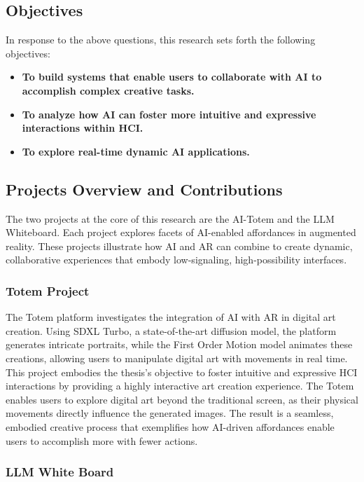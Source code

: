 \subsection{Objectives}

In response to the above questions, this research sets forth the following objectives:

\begin{itemize}
    \item \textbf{To build systems that enable users to collaborate with AI to accomplish complex creative tasks.}
    \item \textbf{To analyze how AI can foster more intuitive and expressive interactions within HCI.}
    \item \textbf{To explore real-time dynamic AI applications.}
\end{itemize}


\subsection{Projects Overview and Contributions}

The two projects at the core of this research are the AI-Totem and the LLM Whiteboard. Each project explores facets of AI-enabled affordances in augmented reality.
These projects illustrate how AI and AR can combine to create dynamic, collaborative experiences that embody low-signaling, high-possibility interfaces.

\subsubsection{Totem Project}

The Totem platform investigates the integration of AI with AR in digital art creation.
Using SDXL Turbo, a state-of-the-art diffusion model, the platform generates intricate portraits, while the First Order Motion model animates these creations, allowing users to manipulate digital art with movements in real time. 
This project embodies the thesis’s objective to foster intuitive and expressive HCI interactions by providing a highly interactive art creation experience.
The Totem enables users to explore digital art beyond the traditional screen, as their physical movements directly influence the generated images.
The result is a seamless, embodied creative process that exemplifies how AI-driven affordances enable users to accomplish more with fewer actions.

\subsubsection{LLM White Board}

